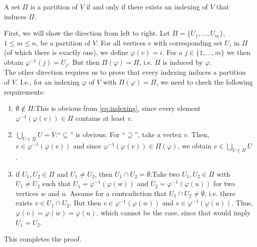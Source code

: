 \documentclass[11pt,a4paper]{article}
\numberwithin{equation}{section}
\newcommand{\idx}{\varphi}
\begin{document}
\begin{lemmarep}
    A set $\Pi$ is a partition of $V$ if and only if there exists an indexing of $V$ that induces $\Pi$.\label{lemma:indexing_partition}
\end{lemmarep}
\begin{appendixproof}
    First, we will show the direction from left to right. Let $\Pi = \{U_1,\dots,U_m\}$, $1\leq m \leq n$, be a partition of $V$. For all vertices $v$ with corresponding set $U_i$ in $\Pi$ (of which there is exactly one), we define $\idx(v) = i$. For a $j \in \{1,\dots,m\}$ we then obtain $\idx^{-1}(j) = U_j$. But then $\Pi(\idx) = \Pi$, i.e. $\Pi$ is induced by $\idx$. 
    \\
    The other direction requires us to prove that every indexing induces a partition of $V$. I.e., for an indexing $\idx$ of $V$ with $\Pi(\idx)=\Pi$, we need to check the following requirements:
    \begin{enumerate}
        \item $\emptyset \not\in \Pi$:\quad This is obvious from \eqref{eq:indexing}, since every element $\idx^{-1}(\idx(v)) \in \Pi$ contains at least $v$. %
        \item $\bigcup_{U \in \Pi} U = V$:\quad ``$\subseteq$'' is obvious. For ``$\supseteq$'', take a vertex $v$. Then, $v \in \idx^{-1}(\idx(v))$ and since $\idx^{-1}(\idx(v)) \in \Pi(\idx)$, we obtain $v \in \bigcup_{U \in \Pi} U$.
        \item if $U_1,U_2 \in \Pi$ and $U_1 \neq U_2$, then $U_1 \cap U_2 = \emptyset$:\quad Take two $U_1, U_2 \in \Pi$ with $U_1 \neq U_2$ such that $U_1 = \idx^{-1}(\idx(w))$ and $U_2 = \idx^{-1}(\idx(u))$ for two vertices $w$ and $u$. Assume for a contradiction that $U_1 \cap U_2 \neq \emptyset$, i.e. there exists $v \in U_1 \cap U_2$. But then $v \in \idx^{-1}(\idx(w))$ and $v \in \idx^{-1}(\idx(u))$. Thus, $\idx(v) = \idx(w) = \idx(u)$, which cannot be the case, since that would imply $U_1 = U_2$.
    \end{enumerate}
    This completes the proof.
\end{appendixproof}
\end{document}
